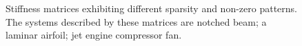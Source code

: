 \documentclass{elsarticle}
\begin{document}
\begin{figure}
\begin{subfigure}{0.3\textwidth}
				\caption{}
				\label{fig:mat_fan}
			\end{subfigure}
			\caption{Stiffness matrices exhibiting different sparsity and non-zero patterns. The systems described by these matrices are  notched beam;  a laminar airfoil;  jet engine compressor fan.}
			\label{fig:matrices}
		\end{figure}
		
		
		
		
\end{document}
